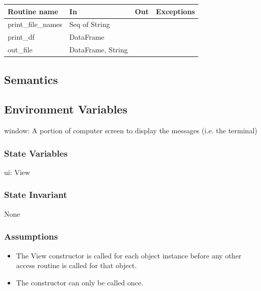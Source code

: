 \documentclass[12pt]{article}
\begin{document}
\begin{tabular}{| l | l | l | p{5cm} |}
  \hline
  \textbf{Routine name} & \textbf{In} & \textbf{Out} & \textbf{Exceptions}\\
  \hline
  print\_file\_names & Seq of String & & \\
  \hline
  print\_df & DataFrame & & \\
  \hline
  out\_file & DataFrame, String & & \\
  \hline
\end{tabular}

\subsection* {Semantics}

\subsection*{Environment Variables}

window: A portion of computer screen to display the messages (i.e. the terminal)

\subsubsection* {State Variables}

ui: View

\subsubsection* {State Invariant}

None

\subsubsection* {Assumptions}

\begin{itemize}
  \item The View constructor is called for each object instance before any 
  other access routine is called for that object.  
  \item The constructor can only be called once.
\end{itemize}
\end{document}
